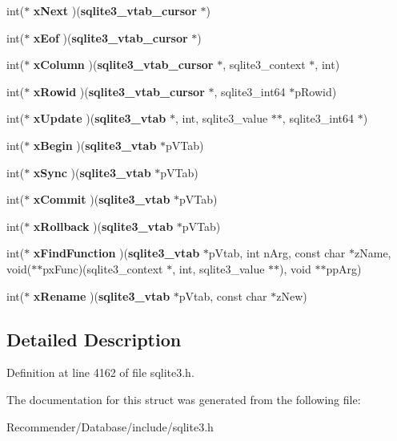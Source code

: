 \begin{CompactItemize}
\item 
int($\ast$ \textbf{xNext} )({\bf sqlite3\_\-vtab\_\-cursor} $\ast$)\label{structsqlite3__module_1c8236d4a9cf4b4b4d9ba827cee89dae}

\item 
int($\ast$ \textbf{xEof} )({\bf sqlite3\_\-vtab\_\-cursor} $\ast$)\label{structsqlite3__module_2cf433018879d601c54d0cf95f5e686c}

\item 
int($\ast$ \textbf{xColumn} )({\bf sqlite3\_\-vtab\_\-cursor} $\ast$, sqlite3\_\-context $\ast$, int)\label{structsqlite3__module_68814ced7e2d7eb49c141d82ac2367a1}

\item 
int($\ast$ \textbf{xRowid} )({\bf sqlite3\_\-vtab\_\-cursor} $\ast$, sqlite3\_\-int64 $\ast$pRowid)\label{structsqlite3__module_73d33a68f6567fd14c90145a4b2a8cb3}

\item 
int($\ast$ \textbf{xUpdate} )({\bf sqlite3\_\-vtab} $\ast$, int, sqlite3\_\-value $\ast$$\ast$, sqlite3\_\-int64 $\ast$)\label{structsqlite3__module_8ce76e9030b77e5c57f1c056462bfe53}

\item 
int($\ast$ \textbf{xBegin} )({\bf sqlite3\_\-vtab} $\ast$pVTab)\label{structsqlite3__module_1e8e1468248bf37543219b075df90db2}

\item 
int($\ast$ \textbf{xSync} )({\bf sqlite3\_\-vtab} $\ast$pVTab)\label{structsqlite3__module_f9a8f4d899e9398f60338ba6bb4c1388}

\item 
int($\ast$ \textbf{xCommit} )({\bf sqlite3\_\-vtab} $\ast$pVTab)\label{structsqlite3__module_f5082ff14fbea2a1a9f076ce5cbda3ea}

\item 
int($\ast$ \textbf{xRollback} )({\bf sqlite3\_\-vtab} $\ast$pVTab)\label{structsqlite3__module_d10fa2ae90ffde704368535d381319c7}

\item 
int($\ast$ \textbf{xFindFunction} )({\bf sqlite3\_\-vtab} $\ast$pVtab, int nArg, const char $\ast$zName, void($\ast$$\ast$pxFunc)(sqlite3\_\-context $\ast$, int, sqlite3\_\-value $\ast$$\ast$), void $\ast$$\ast$ppArg)\label{structsqlite3__module_4cfd59ef1eee6fc5e31954e04acdc9f9}

\item 
int($\ast$ \textbf{xRename} )({\bf sqlite3\_\-vtab} $\ast$pVtab, const char $\ast$zNew)\label{structsqlite3__module_0e5483244b80bf1a818c40d2317f313b}

\end{CompactItemize}


\subsection{Detailed Description}




Definition at line 4162 of file sqlite3.h.

The documentation for this struct was generated from the following file:\begin{CompactItemize}
\item 
Recommender/Database/include/sqlite3.h\end{CompactItemize}
